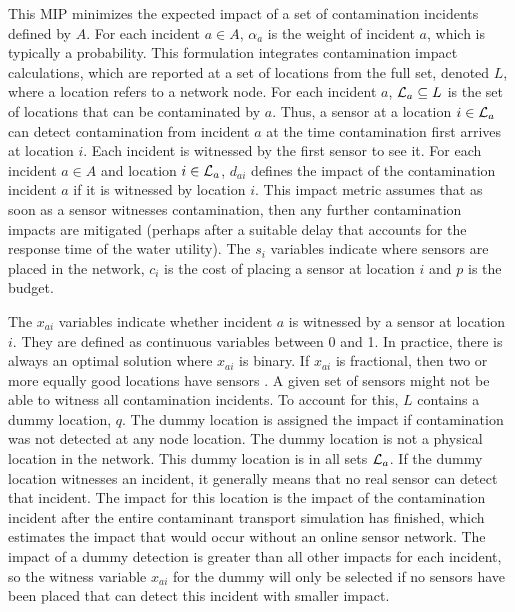This MIP minimizes the expected impact of a set of contamination incidents defined by $A$. 
For each incident $a \in A$, $\alpha_a$ is the weight of incident $a$, which is typically a 
probability. This formulation integrates contamination impact calculations, which 
are reported at a set of locations from the full set, denoted $L$, 
where a location refers to a network node. For each incident $a$, ${\cal L}_a \subseteq L$ 
is the set of locations that can be contaminated by $a$. Thus, a sensor at a 
location $i \in {\cal L}_a$ can detect contamination from incident $a$ at the time 
contamination first arrives at location $i$. Each incident is witnessed 
by the first sensor to see it. For each incident $a \in A$ and location 
$i \in {\cal L}_a$, $d_{ai}$ defines the impact of the contamination incident $a$ 
if it is witnessed by location $i$. This impact metric assumes that as soon as a 
sensor witnesses contamination, then any further contamination impacts are mitigated 
(perhaps after a suitable delay that accounts for the response time of the water utility). 
The $s_i$ variables indicate where sensors are placed in the network, $c_i$ is 
the cost of placing a sensor at location $i$ and $p$ is the budget.

The $x_{ai}$ variables indicate whether incident $a$ is witnessed by a sensor at 
location $i$. They are defined as continuous variables between 0 and 1. 
In practice, there is always an optimal solution where $x_{ai}$ is binary. 
If $x_{ai}$ is fractional, then two or more equally good locations have sensors 
\citet{TEVASPOTCompendium10}. A given set of sensors might not be able to witness 
all contamination incidents. To account for this, $L$ contains a dummy location, $q$. 
The dummy location is assigned the impact if contamination was not detected at any node location. 
The dummy location is not a physical location in the network.
This dummy location is in all sets ${\cal L}_a$. If the dummy location witnesses
an incident, it generally means that no real sensor can detect that incident. The 
impact for this location is the impact of the contamination incident after the entire 
contaminant transport simulation has finished, which estimates the impact that 
would occur without an online sensor network. The impact of a dummy detection is greater
than all other impacts for each incident, so the witness variable $x_{ai}$ for the 
dummy will only be selected if no sensors have been placed that can detect this 
incident with smaller impact.

